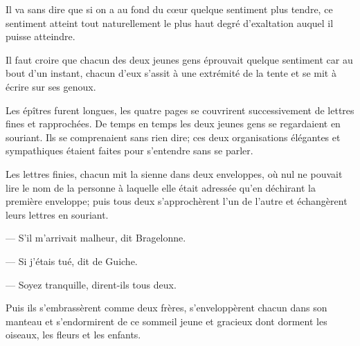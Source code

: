 Il va sans dire que si on a au fond du cœur quelque sentiment plus tendre, ce sentiment atteint tout naturellement le plus haut degré d'exaltation auquel il puisse atteindre.

Il faut croire que chacun des deux jeunes gens éprouvait quelque sentiment car au bout d'un instant, chacun d'eux s'assit à une extrémité de la tente et se mit à écrire sur ses genoux.

Les épîtres furent longues, les quatre pages se couvrirent successivement de lettres fines et rapprochées. De temps en temps les deux jeunes gens se regardaient en souriant. Ils se comprenaient sans rien dire; ces deux organisations élégantes et sympathiques étaient faites pour s'entendre sans se parler.

Les lettres finies, chacun mit la sienne dans deux enveloppes, où nul ne pouvait lire le nom de la personne à laquelle elle était adressée qu'en déchirant la première enveloppe; puis tous deux s'approchèrent l'un de l'autre et échangèrent leurs lettres en souriant.

— S'il m'arrivait malheur, dit Bragelonne.

— Si j'étais tué, dit de Guiche.

— Soyez tranquille, dirent-ils tous deux.

Puis ils s'embrassèrent comme deux frères, s'enveloppèrent chacun dans son manteau et s'endormirent de ce sommeil jeune et gracieux dont dorment les oiseaux, les fleurs et les enfants.